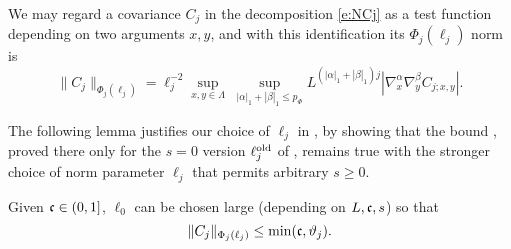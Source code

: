 We may regard a covariance $C_j$ in the decomposition \eqref{e:NCj}
as a test function depending on
two arguments $x,y$, and with this identification its $\Phi_j(\ell_j)$
norm is
\begin{equation}
    \label{e:Phinorm}
    \|C_j\|_{\Phi_{j}(\ell_j)}  =
    \ell_j^{-2}
    \sup_{x,y\in \Lambda}
    \;
    \sup_{|\alpha|_1 + |\beta|_1 \le p_\Phi}
    L^{(|\alpha|_1+  |\beta|_1)j}
    |\nabla_x^{\alpha} \nabla_y^{\beta} C_{j;x,y}|.
\end{equation}

The following lemma justifies our choice of $\ell_j$
in , by showing that the
bound \cite[\eqref{IE-e:CLbd}]{BS-rg-IE}, proved there only for the $s=0$ version
$\ell_j^{\mathrm{old}}$ of ,
remains true with the stronger
choice of norm parameter $\ell_j$ that permits arbitrary $s \ge 0$.

\begin{lemma}
\label{lem:Cbd}
Given $\mathfrak{c} \in (0, 1]$, $\ell_0$ can be chosen large (depending on $L,\mathfrak{c},s$)
so that
\begin{equation}
\lbeq{Cbd}
\|C_j\|_{\Phi_{j}(\ell_j)} \leq \min(\ellconst, \chicCov_j).
\end{equation}
\end{lemma}


